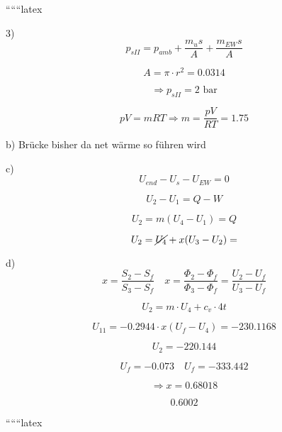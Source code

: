 
``````latex


3)
\begin{equation}
p_{sII} = p_{amb} + \frac{m_{u}s}{A} + \frac{m_{EW}s}{A}
\end{equation}

\begin{equation}
A = \pi \cdot r^2 = 0.0314
\end{equation}

\[
\Rightarrow p_{sII} = 2 \text{ bar}
\]

\begin{equation}
pV = mRT \Rightarrow m = \frac{pV}{RT} = 1.75
\end{equation}

b) Brücke bisher da net wärme so führen wird

c)
\begin{equation}
U_{end} - U_{s} - U_{EW} = 0
\end{equation}

\[
U_2 - U_1 = Q - W
\]

\[
U_2 = m(U_4 - U_1) = Q
\]

\[
U_2 = \cancel{U_4} + x(U_3 - U_2) =
\]

d)
\begin{equation}
x = \frac{S_2 - S_f}{S_3 - S_f} \quad x = \frac{\Phi_2 - \Phi_f}{\Phi_3 - \Phi_f} = \frac{U_2 - U_f}{U_3 - U_f}
\end{equation}

\[
U_2 = m \cdot U_4 + c_v \cdot 4t
\]

\[
U_{11} = -0.2944 \cdot x(U_f - U_4) = -230.1168
\]

\[
U_2 = -220.144
\]

\[
U_f = -0.073 \quad U_f = -333.442
\]

\[
\Rightarrow x = 0.68018
\]

\[
0.6002
\]

``````latex


